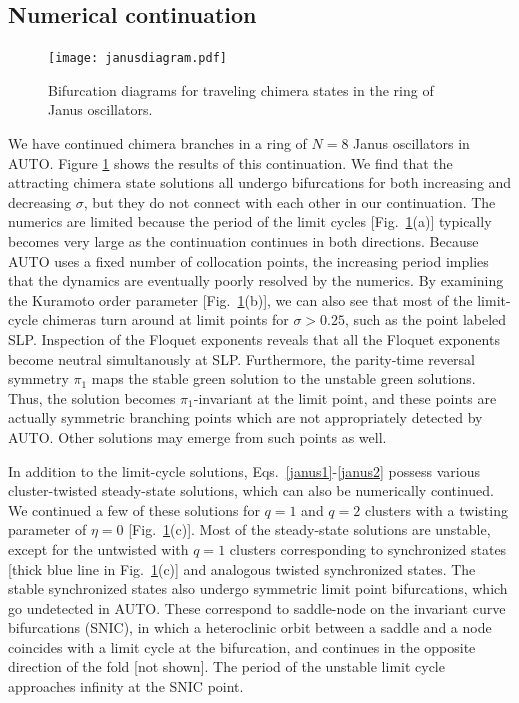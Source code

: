 \documentclass[aps,pre,amsmath,amssymb,floatfix,onecolumn,notitlepage,10pt]{revtex4-1}
\begin{document}
\subsection{Numerical continuation}
\begin{figure}[htb]
\texttt{[image: janusdiagram.pdf]}
\caption{Bifurcation diagrams for traveling chimera states in the ring of Janus oscillators. \label{fig4}}
\end{figure}
We have continued chimera branches in a ring of $N=8$ Janus oscillators in AUTO. Figure \ref{fig4} shows the results of this continuation.  We find that the attracting chimera state solutions all undergo bifurcations for both increasing and decreasing $\sigma$, but they do not connect with each other in our continuation. The numerics are limited because the period of the limit cycles [Fig.~\ref{fig4}(a)] typically becomes very large as the continuation continues in both directions. Because AUTO uses a fixed number of collocation points, the increasing period implies that the dynamics are eventually poorly resolved by the numerics. By examining the  Kuramoto order parameter [Fig.~\ref{fig4}(b)], we can also see that most of the limit-cycle chimeras turn around at limit points for $\sigma>0.25$, such as the point labeled SLP. Inspection of the Floquet exponents reveals that all the Floquet exponents become neutral simultanously at SLP. Furthermore, the parity-time reversal symmetry $\pi_1$ maps the stable green solution to the unstable green solutions. Thus, the solution becomes $\pi_1$-invariant at the limit point, and these points are actually symmetric branching points which are not appropriately detected by AUTO. Other solutions may emerge from such points as well.

In addition to the limit-cycle solutions, Eqs.~\eqref{janus1}-\eqref{janus2} possess various cluster-twisted steady-state solutions, which can also be numerically continued. We continued a few of these solutions for $q=1$ and $q=2$ clusters with a twisting parameter of $\eta=0$ [Fig.~\ref{fig4}(c)]. Most of the steady-state solutions are unstable, except for the untwisted with $q=1$ clusters corresponding to synchronized states [thick blue line in Fig.~\ref{fig4}(c)] and analogous twisted synchronized states. The stable synchronized states also undergo symmetric limit point bifurcations, which go undetected in AUTO. These correspond to saddle-node on the invariant curve bifurcations (SNIC), in which a heteroclinic orbit between a saddle and a node coincides with a limit cycle at the bifurcation, and continues in the opposite direction of the fold [not shown]. The period of the unstable limit cycle approaches infinity at the SNIC point.  
\end{document}
